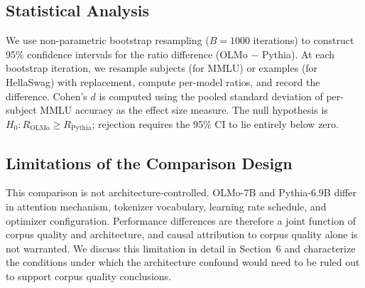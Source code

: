 \subsection{Statistical Analysis}

We use non-parametric bootstrap resampling ($B = 1000$ iterations) to construct 95\% confidence intervals for the ratio difference (OLMo $-$ Pythia). At each bootstrap iteration, we resample subjects (for MMLU) or examples (for HellaSwag) with replacement, compute per-model ratios, and record the difference. Cohen's $d$ is computed using the pooled standard deviation of per-subject MMLU accuracy as the effect size measure. The null hypothesis is $H_0: R_{\text{OLMo}} \geq R_{\text{Pythia}}$; rejection requires the 95\% CI to lie entirely below zero.

\subsection{Limitations of the Comparison Design}

This comparison is not architecture-controlled. OLMo-7B and Pythia-6.9B differ in attention mechanism, tokenizer vocabulary, learning rate schedule, and optimizer configuration. Performance differences are therefore a joint function of corpus quality and architecture, and causal attribution to corpus quality alone is not warranted. We discuss this limitation in detail in Section~6 and characterize the conditions under which the architecture confound would need to be ruled out to support corpus quality conclusions.
